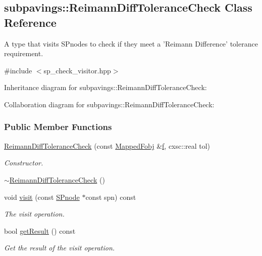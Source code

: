 \hypertarget{classsubpavings_1_1ReimannDiffToleranceCheck}{\subsection{subpavings\-:\-:\-Reimann\-Diff\-Tolerance\-Check \-Class \-Reference}
\label{classsubpavings_1_1ReimannDiffToleranceCheck}
}


\-A type that visits  \-S\-Pnodes to check if they meet a '\-Reimann \-Difference' tolerance requirement.  




{\ttfamily \#include $<$sp\-\_\-check\-\_\-visitor.\-hpp$>$}



\-Inheritance diagram for subpavings\-:\-:\-Reimann\-Diff\-Tolerance\-Check\-:


\-Collaboration diagram for subpavings\-:\-:\-Reimann\-Diff\-Tolerance\-Check\-:
\subsubsection*{\-Public \-Member \-Functions}
\begin{DoxyCompactItemize}
\item 
\hyperlink{classsubpavings_1_1ReimannDiffToleranceCheck_a28f47ed9d5b431cc2e7b915443d85e92}{\-Reimann\-Diff\-Tolerance\-Check} (const \hyperlink{classsubpavings_1_1MappedFobj}{\-Mapped\-Fobj} \&\hyperlink{errorfunc_8hpp_aacb77b1211a6ca2e2beff1811cf9ecf4}{f}, cxsc\-::real tol)
\begin{DoxyCompactList}\small\item\em \-Constructor. \end{DoxyCompactList}\item 
\hyperlink{classsubpavings_1_1ReimannDiffToleranceCheck_a85ec1af41f9cb2d7a4b34ceda35be98b}{$\sim$\-Reimann\-Diff\-Tolerance\-Check} ()
\item 
void \hyperlink{classsubpavings_1_1ReimannDiffToleranceCheck_a2b5d9ad63206b70e195b5044fec56e39}{visit} (const \hyperlink{classsubpavings_1_1SPnode}{\-S\-Pnode} $\ast$const spn) const 
\begin{DoxyCompactList}\small\item\em \-The visit operation. \end{DoxyCompactList}\item 
bool \hyperlink{classsubpavings_1_1ReimannDiffToleranceCheck_a61eb963b4e6767a29479f37b32c23ce8}{get\-Result} () const 
\begin{DoxyCompactList}\small\item\em \-Get the result of the visit operation. \end{DoxyCompactList}\end{DoxyCompactItemize}
